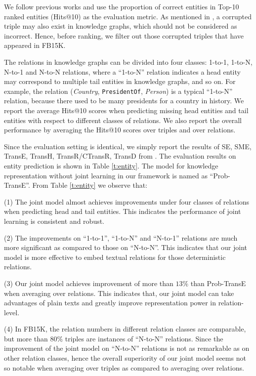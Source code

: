 \documentclass[11pt,a4paper]{article}
\begin{document}
We follow previous works and use the proportion of correct entities in Top-10 ranked entities (Hits@10) as the evaluation metric. As mentioned in \cite{bordes2013translating}, a corrupted triple may also exist in knowledge graphs, which should not be considered as incorrect. Hence, before ranking, we filter out those corrupted triples that have appeared in FB15K.

The relations in knowledge graphs can be divided into four classes: 1-to-1, 1-to-N, N-to-1 and N-to-N relations, where a ``1-to-N'' relation indicates a head entity may correspond to multiple tail entities in knowledge graphs, and so on. For example, the relation (\emph{Country}, \texttt{PresidentOf}, \emph{Person}) is a typical ``1-to-N'' relation, because there used to be many presidents for a country in history. We report the average Hits@10 scores when predicting missing head entities and tail entities with respect to different classes of relations. We also report the overall performance by averaging the Hits@10 scores over triples and over relations.

Since the evaluation setting is identical, we simply report the results of SE, SME, TransE, TransH, TransR/CTransR, TransD from \cite{bordes2011learning,bordes2012joint,bordes2013translating,wang2014transh,lin2015learning,ji2015knowledge}. The evaluation results on entity prediction is shown in Table \ref{t:entity}. The model for knowledge representation without joint learning in our framework is named as ``Prob-TransE''. From Table \ref{t:entity} we observe that:

(1) The joint model almost achieves improvements under four classes of relations when predicting head and tail entities. This indicates the performance of joint learning is consistent and robust. 

(2) The improvements on ``1-to-1'', ``1-to-N'' and ``N-to-1'' relations are much more significant as compared to those on ``N-to-N''. This indicates that our joint model is more effective to embed textual relations for those deterministic relations.

(3) Our joint model achieves improvement of more than $13\%$ than Prob-TransE when averaging over relations. This indicates that, our joint model can take advantages of plain texts and greatly improve representation power in relation-level.

(4) In FB15K, the relation numbers in different relation classes are comparable, but more than $80\%$ triples are instances of ``N-to-N'' relations. Since the improvement of the joint model on ``N-to-N'' relations is not as remarkable as on other relation classes, hence the overall superiority of our joint model seems not so notable when averaging over triples as compared to averaging over relations.
\end{document}
